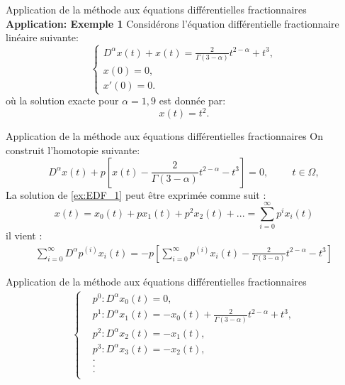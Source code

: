 \documentclass{sintefbeamer}
\begin{document}
\begin{frame}{Application de la méthode aux équations différentielles fractionnaires}
    \textbf{Application: Exemple 1}
    Considérons l'équation différentielle fractionnaire linéaire suivante:
\begin{equation}
    \begin{cases}\label{ex:EDF_1}
        D^{\alpha}x(t) + x(t) = \frac{2}{\Gamma(3-\alpha)} t^{2-\alpha} + t^3,\\
        x(0)=0,\\
        x'(0)=0.
    \end{cases}
\end{equation}
où la solution exacte pour $\alpha = 1,9$ est donnée par:
\begin{equation}
    x(t)=t^2.
\end{equation}
\end{frame}


\begin{frame}{Application de la méthode aux équations différentielles fractionnaires}
    On construit l'homotopie suivante:
\begin{equation} \label{eq:HPM_EDF1}
    D^{\alpha} x(t) +p\left[x(t)-\frac{2}{\Gamma(3-\alpha)}t^{2-\alpha}-t^3\right] =0, \hspace{1cm} t\in \Omega,
\end{equation}
La solution de \ref{ex:EDF_1} peut être exprimée comme suit :
\begin{equation}\label{sol:EDF_1}
    x(t) =x_0(t) + px_1(t) + p^2x_2(t) + ... = \sum _{i=0}^{\infty} p^i x_i(t)
\end{equation}
 il vient :
\begin{align*}
    \sum_{i=0}^{\infty} D^{\alpha} p^{(i)} x_i(t) = -p\left[\sum_{i=0}^{\infty} p^{(i)} x_i(t) -\frac{2}{\Gamma(3-\alpha)} t^{2-\alpha} -t^3\right]
\end{align*}
\end{frame}

\begin{frame}{Application de la méthode aux équations différentielles fractionnaires}
\begin{align} \label{eq:p_1}
    \begin{cases}
    & p^0 : D^{\alpha}x_0(t)=0, \\
    & p^1 : D^{\alpha}x_1(t) = -x_0(t) + \frac{2}{\Gamma(3-\alpha)} t^{2-\alpha} + t^3,\\
    & p^2 : D^{\alpha} x_2(t) = -x_1(t),\\
    & p^3 : D^{\alpha} x_3(t) = -x_2(t),\\
    &     . \\
    &     .\\
    &     .\\
    \end{cases}
\end{align}
\end{frame}
\end{document}
